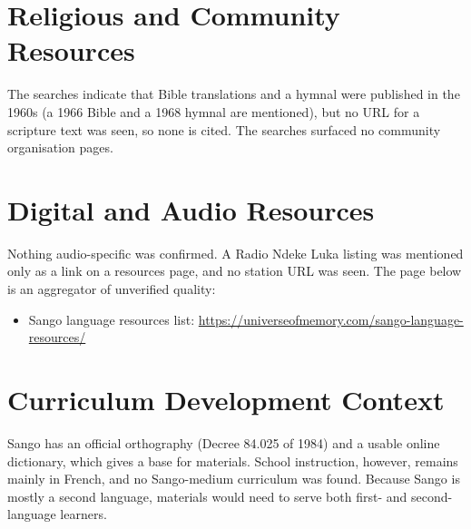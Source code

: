 \documentclass[12pt]{article}
\begin{document}
\section{Religious and Community Resources}
The searches indicate that Bible translations and a hymnal were published in the 1960s (a 1966 Bible and a 1968 hymnal are mentioned), but no URL for a scripture text was seen, so none is cited. The searches surfaced no community organisation pages.

\section{Digital and Audio Resources}
Nothing audio-specific was confirmed. A Radio Ndeke Luka listing was mentioned only as a link on a resources page, and no station URL was seen. The page below is an aggregator of unverified quality:
\begin{itemize}
\item Sango language resources list: \url{https://universeofmemory.com/sango-language-resources/}
\end{itemize}

\section{Curriculum Development Context}
Sango has an official orthography (Decree 84.025 of 1984) and a usable online dictionary, which gives a base for materials. School instruction, however, remains mainly in French, and no Sango-medium curriculum was found. Because Sango is mostly a second language, materials would need to serve both first- and second-language learners.
\end{document}
